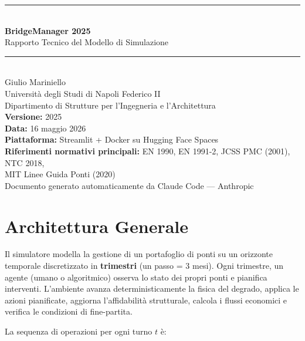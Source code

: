 \documentclass[11pt,a4paper]{article}
\begin{document}
\begin{titlepage}
  \centering
  \vspace*{2cm}
  {\color{uniblu}\rule{\linewidth}{2pt}}\\[1em]
  {\Huge\bfseries BridgeManager 2025}\\[0.4em]
  {\Large Rapporto Tecnico del Modello di Simulazione}\\[1em]
  {\color{uniblu}\rule{\linewidth}{1pt}}\\[2em]
  {\large Giulio Mariniello}\\[0.3em]
  {\normalsize Universit\`a degli Studi di Napoli Federico II\\
  Dipartimento di Strutture per l'Ingegneria e l'Architettura}\\[3em]
  {\normalsize
    \textbf{Versione:} 2025\\[0.3em]
    \textbf{Data:} 16 maggio 2026\\[0.3em]
    \textbf{Piattaforma:} Streamlit + Docker su Hugging Face Spaces\\[0.3em]
    \textbf{Riferimenti normativi principali:} EN 1990, EN 1991-2, JCSS PMC (2001), NTC 2018,\\
    MIT Linee Guida Ponti (2020)
  }\\[3em]
  \vfill
  {\small\color{gray}Documento generato automaticamente da Claude Code --- Anthropic}
\end{titlepage}

\tableofcontents
\newpage

\section{Architettura Generale}

Il simulatore modella la gestione di un portafoglio di ponti su un orizzonte temporale discretizzato in \textbf{trimestri} (un passo = 3 mesi). Ogni trimestre, un agente (umano o algoritmico) osserva lo stato dei propri ponti e pianifica interventi. L'ambiente avanza deterministicamente la fisica del degrado, applica le azioni pianificate, aggiorna l'affidabilit\`a strutturale, calcola i flussi economici e verifica le condizioni di fine-partita.

La sequenza di operazioni per ogni turno $t$ \`e:
\end{document}
